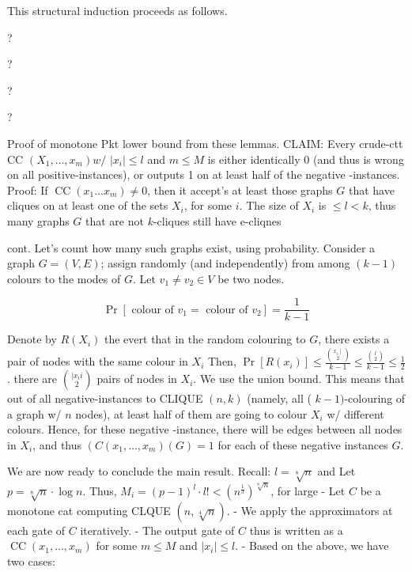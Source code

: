 This structural induction proceeds as follows. 


?

?

?

?




Proof of monotone Pkt lower bound from these lemmas. CLAIM: Every crude-ctt CC $\left(X_1, \ldots, x_m\right) w /$ $\left|x_i\right| \leq l$ and $m \leqslant M$ is either identically 0 (and thus is wrong on all positive-instances), or outputs 1 on at least half of the negative -instances.
Proof: If $\operatorname{CC}\left(x_1 \ldots x_m\right) \neq 0$, then it accept's at least those graphs $G$ that have cliques on at least one of the sets $X_i$, for some $i$. The size of $X_i$ is $\leqslant l<k$, thus many graphs $G$ that are not $k$-cliques still have e-cliqnes



cont.
Let's count how many such graphs exist, using probability. Consider a graph $G=(V, E)$; assign randomly (and independently) from among $(k-1)$ colours to the modes of $G$. Let $v_1 \neq v_2 \in V$ be two nodes.

$$
\operatorname{Pr}\left[\text { colour of } v_1=\text { colour of } v_2\right]=\frac{1}{k-1}
$$


Denote by $R\left(X_i\right)$ the evert that in the random colouring to $G$, there exists a pair of nodes with the same colour in $X_i$
Then, $\operatorname{Pr}\left[R\left(x_i\right)\right] \leqslant \frac{\binom{x_i \mid}{ 2}}{k-1} \leqslant \frac{\binom{l}{2}}{k-1} \leqslant \frac{1}{2}$.
there are $\binom{\mid x_i i}{2}$ pairs
of nodes in $X_i$. We use
the union bound.
This means that out of all negative-instances to CLIQUE $(n, k)$ (namely, all ( $k-1)$-colouring of a graph w/ $n$ nodes), at least half of them are going to colour $X_i$ w/ different colours. Hence, for these negative -instance, there will be edges between all nodes in $X_i$, and thus $\left(C\left(x_1, \ldots, x_m\right)(G)=1\right.$ for each of these negative instances $G$.




We are now ready to conclude the main result.
Recall: $l=\sqrt[8]{n}$ and
Let $p=\sqrt[8]{n} \cdot \log n$. Thus, $M_i=(p-1)^l \cdot l!<\left(n^{\frac{1}{3}}\right)^{\sqrt[8]{n}}$, for large
- Let $C$ be a monotone cat computing CLQUE $(n, \sqrt[4]{n})$.
- We apply the approximators at each gate of $C$ iteratively.
- The output gate of $C$ thus is written as a $\operatorname{CC}\left(x_1, \ldots, x_m\right)$ for some $m \leqslant M$ and $\left|x_i\right| \leqslant l$.
- Based on the above, we have two cases:

